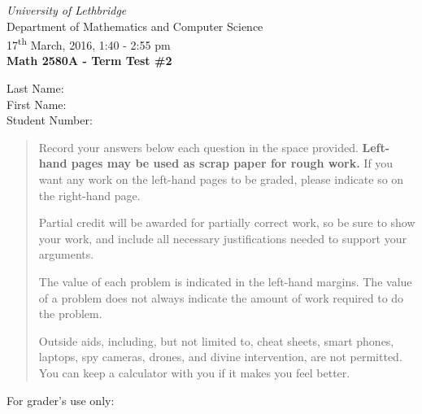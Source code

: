 \documentclass[12pt]{article}
\newcommand{\skipline}{\vspace{12pt}}
\begin{document}
\author{Instructor: Sean Fitzpatrick}
\thispagestyle{plain}
\begin{center}
\emph{University of Lethbridge}\\
Department of Mathematics and Computer Science\\
17\textsuperscript{th} March, 2016, 1:40 - 2:55 pm\\
{\bf Math 2580A - Term Test \#2}\\
\end{center}
\skipline \skipline \skipline \noindent \skipline
Last Name:\underline{\hspace{350pt}}\\
\skipline
First Name:\underline{\hspace{348pt}}\\
\skipline
Student Number:\underline{\hspace{322pt}}\\


\vspace{0.5in}


\begin{quote}
 Record your answers below each question in the space provided.    {\bf Left-hand pages may be used as scrap paper for rough work.}  If you want any work on the left-hand pages to be graded, please indicate so on the right-hand page.
 
 \bigskip
 
Partial credit will be awarded for partially correct work, so be sure to show your work, and include all necessary justifications needed to support your arguments. 

The value of each problem is indicated in the left-hand margins. The value of a problem does not always indicate the amount of work required to do the problem.

Outside aids, including, but not limited to, cheat sheets, smart phones, laptops, spy cameras, drones, and divine intervention, are not permitted. You can keep a calculator with you if it makes you feel better.
\end{quote}


\vspace{0.5in}

For grader's use only:
\end{document}
